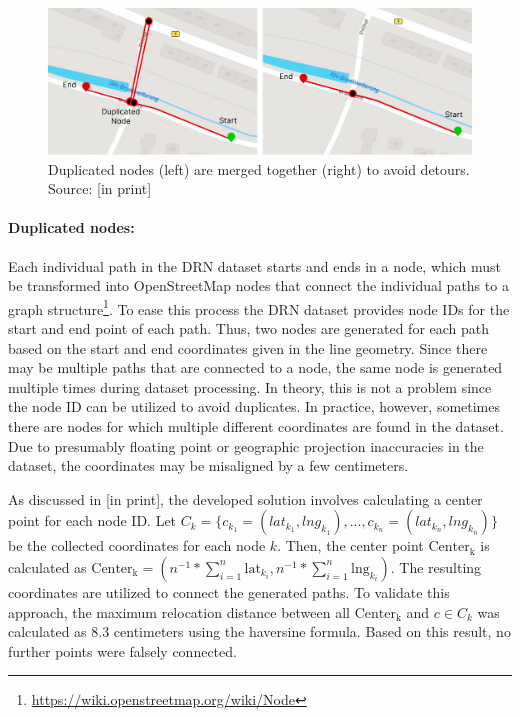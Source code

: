 \begin{figure}[htbp]
\centering
\includegraphics[width=\linewidth]{images/node-merging.png}
\caption{Duplicated nodes (left) are merged together (right) to avoid detours. Source: [in print]}
\label{fig:node-merging}
\end{figure}

\paragraph{Duplicated nodes:} Each individual path in the DRN dataset starts and ends in a node, which must be transformed into OpenStreetMap nodes that connect the individual paths to a graph structure\footnote{\url{https://wiki.openstreetmap.org/wiki/Node}}. To ease this process the DRN dataset provides node IDs for the start and end point of each path. Thus, two nodes are generated for each path based on the start and end coordinates given in the line geometry. Since there may be multiple paths that are connected to a node, the same node is generated multiple times during dataset processing. In theory, this is not a problem since the node ID can be utilized to avoid duplicates. In practice, however, sometimes there are nodes for which multiple different coordinates are found in the dataset. Due to presumably floating point or geographic projection inaccuracies in the dataset, the coordinates may be misaligned by a few centimeters.

As discussed in [in print], the developed solution involves calculating a center point for each node ID. Let $C_k = \{c_{k_1} = (lat_{k_1}, lng_{k_1}), \text{...} , c_{k_n} = (lat_{k_n}, lng_{k_n})\}$ be the collected coordinates for each node $k$. Then, the center point $\text{Center}_{\text{k}}$ is calculated as $\text{Center}_{\text{k}} = \left(n^{-1} * {\sum_{i=1}^{n} \text{{lat}}_{k_i}}, {n^{-1} * \sum_{i=1}^{n} \text{{lng}}_{k_i}}\right)$. The resulting coordinates are utilized to connect the generated paths. To validate this approach, the maximum relocation distance between all $\text{Center}_{\text{k}}$ and $c \in C_k$ was calculated as 8.3 centimeters using the haversine formula. Based on this result, no further points were falsely connected.

